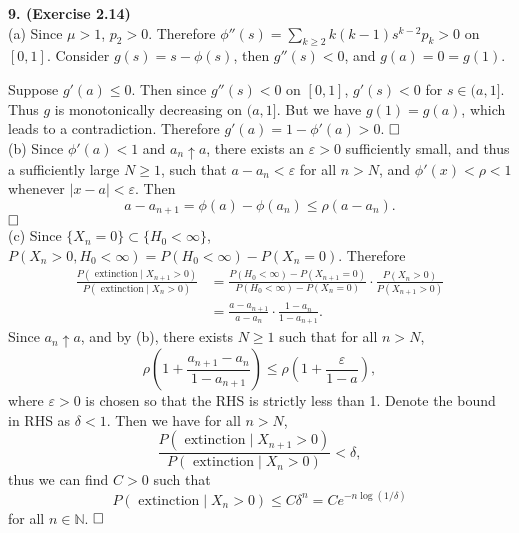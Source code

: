 \documentclass[12pt]{extarticle}
\begin{document}
\noindent
\textbf{9. (Exercise 2.14)} \\
(a) Since $\mu>1$, $p_2>0$.
Therefore $\phi''(s)=\sum_{k\geq 2}k(k-1)s^{k-2}p_k>0$ on $[0,1]$.
Consider $g(s)=s-\phi(s)$, then $g''(s)<0$, and $g(a)=0=g(1)$.

Suppose $g'(a)\leq 0$.
Then since $g''(s)<0$ on $[0,1]$, $g'(s)< 0$ for $s\in(a,1]$. Thus $g$ is monotonically decreasing on $(a,1]$. But we have $g(1)=g(a)$, which leads to a contradiction.
Therefore $g'(a)=1-\phi'(a)>0$.
$\hspace{\fill}\square$ \\
(b) Since $\phi'(a)<1$ and $a_n\uparrow a$, there exists an $\varepsilon>0$ sufficiently small, and thus a sufficiently large $N\geq 1$, such that $a-a_n<\varepsilon$ for all $n>N$, and $\phi'(x)<\rho<1$ whenever $|x-a|<\varepsilon$.
Then
\[
a-a_{n+1}=\phi(a)-\phi(a_n)\leq\rho(a-a_n).
\]
$\hspace{\fill}\square$\\
(c)
Since $\{X_n=0\}\subset\{H_0<\infty\}$, $P(X_n>0, H_0<\infty)=P(H_0<\infty)-P(X_n=0)$.
Therefore
\[
\begin{aligned}
\frac{P(\text{ extinction}\mid X_{n+1}>0)}{P(\text{ extinction}\mid X_{n}>0)}
&=\frac{P(H_0<\infty)-P(X_{n+1}=0)}{P(H_0<\infty)-P(X_n=0)}\cdot\frac{P(X_n>0)}{P(X_{n+1}>0)} \\&
=\frac{a-a_{n+1}}{a-a_n}\cdot\frac{1-a_n}{1-a_{n+1}}.
\end{aligned}
\]
Since $a_n\uparrow a$, and by (b), there exists $N\geq 1$ such that for all $n>N$,
\[
\rho\left(1+\frac{a_{n+1}-a_n}{1-a_{n+1}}\right)\leq\rho\left(1+\frac{\varepsilon}{1-a}\right),
\]
where $\varepsilon>0$ is chosen so that the RHS is strictly less than 1.
Denote the bound in RHS as $\delta<1$.
Then we have for all $n>N$,
\[
\frac{P(\text{ extinction}\mid X_{n+1}>0)}{P(\text{ extinction}\mid X_{n}>0)}<\delta,
\]
thus we can find $C>0$ such that
\[
P(\text{ extinction}\mid X_{n}>0)
\leq
C\delta^n=Ce^{-n\log(1/\delta)}
\]
for all $n\in\mathbb{N}$.
$\hspace{\fill}\square$
\end{document}
